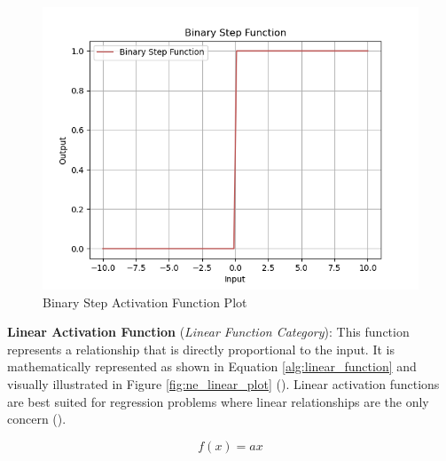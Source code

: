 \begin{figure}[H] %
    \centering %
    \includegraphics[width=\textwidth]{Figures/chapter_ne/ne_binary_step_plot.png} %
    \caption{Binary Step Activation Function Plot}
    \label{fig:ne_binary_step_plot} %
\end{figure}

\parbreak\noindent \textbf{Linear Activation Function} (\textit{Linear Function Category}): This function represents a relationship that is directly proportional to the input. It is mathematically represented as shown in Equation \ref{alg:linear_function} and visually illustrated in Figure \ref{fig:ne_linear_plot} (\cite{sharma2017activation}). Linear activation functions are best suited for regression problems where linear relationships are the only concern (\cite{sharma2017activation}).
  
\begin{ceqn}
    \begin{equation}\label{alg:linear_function}
        f(x) = ax
    \end{equation}
\end{ceqn}

